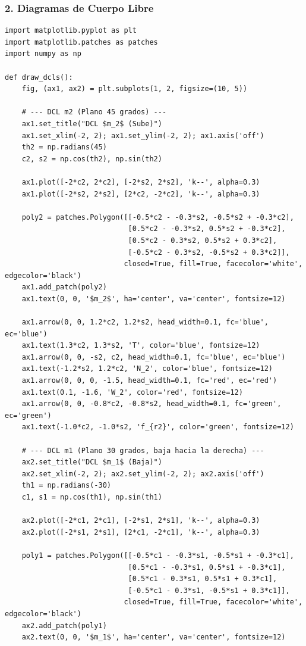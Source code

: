 \documentclass[12pt, a4paper]{article}
\begin{document}
\subsubsection*{2. Diagramas de Cuerpo Libre}
\begin{lstlisting}
import matplotlib.pyplot as plt
import matplotlib.patches as patches
import numpy as np

def draw_dcls():
    fig, (ax1, ax2) = plt.subplots(1, 2, figsize=(10, 5))
    
    # --- DCL m2 (Plano 45 grados) ---
    ax1.set_title("DCL $m_2$ (Sube)")
    ax1.set_xlim(-2, 2); ax1.set_ylim(-2, 2); ax1.axis('off')
    th2 = np.radians(45)
    c2, s2 = np.cos(th2), np.sin(th2)
    
    ax1.plot([-2*c2, 2*c2], [-2*s2, 2*s2], 'k--', alpha=0.3)
    ax1.plot([-2*s2, 2*s2], [2*c2, -2*c2], 'k--', alpha=0.3)
    
    poly2 = patches.Polygon([[-0.5*c2 - -0.3*s2, -0.5*s2 + -0.3*c2], 
                             [0.5*c2 - -0.3*s2, 0.5*s2 + -0.3*c2], 
                             [0.5*c2 - 0.3*s2, 0.5*s2 + 0.3*c2], 
                             [-0.5*c2 - 0.3*s2, -0.5*s2 + 0.3*c2]], 
                            closed=True, fill=True, facecolor='white', edgecolor='black')
    ax1.add_patch(poly2)
    ax1.text(0, 0, '$m_2$', ha='center', va='center', fontsize=12)
    
    ax1.arrow(0, 0, 1.2*c2, 1.2*s2, head_width=0.1, fc='blue', ec='blue')
    ax1.text(1.3*c2, 1.3*s2, 'T', color='blue', fontsize=12)
    ax1.arrow(0, 0, -s2, c2, head_width=0.1, fc='blue', ec='blue')
    ax1.text(-1.2*s2, 1.2*c2, 'N_2', color='blue', fontsize=12)
    ax1.arrow(0, 0, 0, -1.5, head_width=0.1, fc='red', ec='red')
    ax1.text(0.1, -1.6, 'W_2', color='red', fontsize=12)
    ax1.arrow(0, 0, -0.8*c2, -0.8*s2, head_width=0.1, fc='green', ec='green')
    ax1.text(-1.0*c2, -1.0*s2, 'f_{r2}', color='green', fontsize=12)
    
    # --- DCL m1 (Plano 30 grados, baja hacia la derecha) ---
    ax2.set_title("DCL $m_1$ (Baja)")
    ax2.set_xlim(-2, 2); ax2.set_ylim(-2, 2); ax2.axis('off')
    th1 = np.radians(-30)
    c1, s1 = np.cos(th1), np.sin(th1)
    
    ax2.plot([-2*c1, 2*c1], [-2*s1, 2*s1], 'k--', alpha=0.3)
    ax2.plot([-2*s1, 2*s1], [2*c1, -2*c1], 'k--', alpha=0.3)
    
    poly1 = patches.Polygon([[-0.5*c1 - -0.3*s1, -0.5*s1 + -0.3*c1], 
                             [0.5*c1 - -0.3*s1, 0.5*s1 + -0.3*c1], 
                             [0.5*c1 - 0.3*s1, 0.5*s1 + 0.3*c1], 
                             [-0.5*c1 - 0.3*s1, -0.5*s1 + 0.3*c1]], 
                            closed=True, fill=True, facecolor='white', edgecolor='black')
    ax2.add_patch(poly1)
    ax2.text(0, 0, '$m_1$', ha='center', va='center', fontsize=12)
    

\end{lstlisting}
\end{document}
